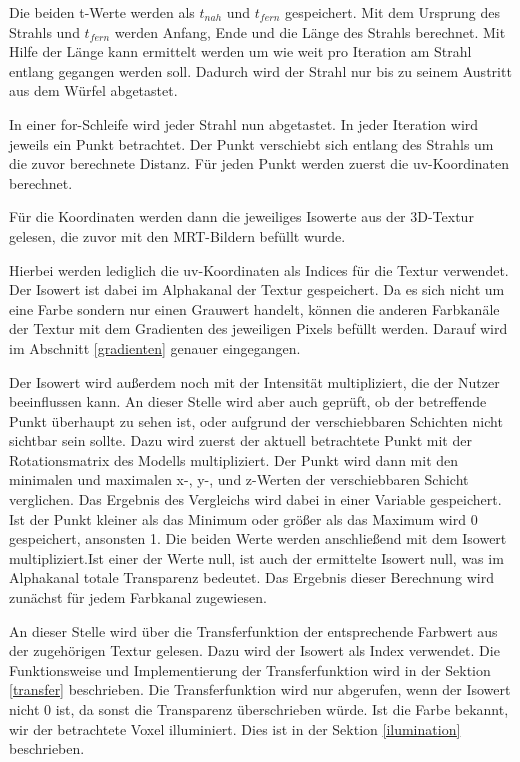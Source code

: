 Die beiden t-Werte werden als $t_{nah}$ und $t_{fern}$ gespeichert.
Mit dem Ursprung des Strahls und $t_{fern}$ werden Anfang, Ende und die Länge des Strahls berechnet. Mit Hilfe der Länge kann ermittelt werden um wie weit pro Iteration am Strahl entlang gegangen werden soll. Dadurch wird der Strahl nur bis zu seinem Austritt aus dem Würfel abgetastet. 

In einer for-Schleife wird jeder Strahl nun abgetastet. In jeder Iteration wird jeweils ein Punkt betrachtet. Der Punkt verschiebt sich entlang des Strahls um die zuvor berechnete Distanz.
Für jeden Punkt werden zuerst die uv-Koordinaten berechnet.

Für die Koordinaten werden dann die jeweiliges Isowerte aus der 3D-Textur gelesen, die zuvor mit den MRT-Bildern befüllt wurde.

Hierbei werden lediglich die uv-Koordinaten als Indices für die Textur verwendet. 
Der Isowert ist dabei im Alphakanal der Textur gespeichert. Da es sich nicht um eine Farbe sondern nur einen Grauwert handelt, können die anderen Farbkanäle der Textur mit dem Gradienten des jeweiligen Pixels befüllt werden. Darauf wird im Abschnitt \ref{gradienten} genauer eingegangen.

Der Isowert wird außerdem noch mit der Intensität multipliziert, die der Nutzer beeinflussen kann.
An dieser Stelle wird aber auch geprüft, ob der betreffende Punkt überhaupt zu sehen ist, oder aufgrund der verschiebbaren Schichten nicht sichtbar sein sollte. 
Dazu wird zuerst der aktuell betrachtete Punkt mit der Rotationsmatrix des Modells multipliziert.
Der Punkt wird dann mit den minimalen und maximalen x-, y-, und z-Werten der verschiebbaren Schicht verglichen. Das Ergebnis des Vergleichs wird dabei in einer Variable gespeichert. Ist der Punkt kleiner als das Minimum oder größer als das Maximum wird 0 gespeichert, ansonsten 1. 
Die beiden Werte werden anschließend mit dem Isowert multipliziert.Ist einer der Werte null, ist auch der ermittelte Isowert null, was im Alphakanal totale Transparenz bedeutet. 
Das Ergebnis dieser Berechnung wird zunächst für jedem Farbkanal zugewiesen.

An dieser Stelle wird über die Transferfunktion der entsprechende Farbwert aus der zugehörigen Textur gelesen. Dazu wird der Isowert als Index verwendet. Die Funktionsweise und Implementierung der Transferfunktion wird in der Sektion \ref{transfer} beschrieben.
Die Transferfunktion wird nur abgerufen, wenn der Isowert nicht 0 ist, da sonst die Transparenz überschrieben würde.
Ist die Farbe bekannt, wir der betrachtete Voxel illuminiert. Dies ist in der Sektion \ref{ilumination} beschrieben. 

